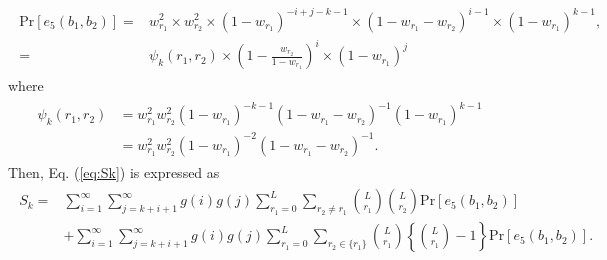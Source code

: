 \begin{align}\begin{split}
  \mathrm{Pr}[e_5(b_1,b_2)]
  =& w_{r_1}^2  \times w_{r_2}^2 
  \times (1-w_{r_1})^{-i+j-k-1} 
  \times (1-w_{r_1}-w_{r_2})^{i-1}
  \times (1-w_{r_1})^{k-1}, \\
  =&\psi_k(r_1,r_2)\times \left(1-\frac{w_{r_2}}{1-w_{r_1}} \right)^{i} \times (1-w_{r_1})^j
\end{split}\end{align}
%
where
\begin{align}\begin{split}\label{eq:psi_k}
  \psi_k(r_1,r_2) 
  &= w_{r_1}^2 w_{r_2}^2 
    (1-w_{r_1})^{-k-1} 
    (1-w_{r_1}-w_{r_2})^{-1}
    (1-w_{r_1})^{k-1} \\
  &= w_{r_1}^2 w_{r_2}^2 (1-w_{r_1})^{-2} (1-w_{r_1}-w_{r_2})^{-1}.
\end{split}\end{align}
%
Then, Eq. (\ref{eq:Sk}) is expressed as
\begin{align}\begin{split}\label{eq:Sk_case5}
  S_k 
  =& \sum_{i=1}^{\infty}\sum_{j=k+i+1}^{\infty} g(i)g(j) \sum_{r_1=0}^{L} \sum_{r_2 \neq r_1} \binom{L}{r_1}\binom{L}{r_2}\mathrm{Pr}[e_5(b_1,b_2)]\\ 
  &+ \sum_{i=1}^{\infty}\sum_{j=k+i+1}^{\infty} g(i)g(j) \sum_{r_1=0}^{L} \sum_{r_2 \in \{r_1\}} \binom{L}{r_1} \left\{\binom{L}{r_1}-1 \right\}\mathrm{Pr}[e_5(b_1,b_2)].
\end{split}\end{align}
